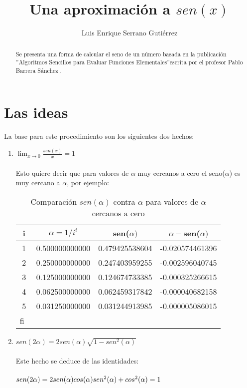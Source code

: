 \documentclass[letter,12pt]{article}
\title{Una aproximación a $sen(x)$}
\author{Luis Enrique Serrano Gutiérrez}
\begin{document}
\maketitle


\begin{abstract}
Se presenta una forma de calcular el seno de un número basada en la publicación ''Algoritmos Sencillos para Evaluar Funciones Elementales''escrita por el profesor Pablo Barrera Sánchez \cite{AlgoritmosPablo}.
\end{abstract}

\section*{Las ideas}
La base para este procedimiento son los siguientes dos hechos: 
\begin{enumerate}
	\item $\lim_{x\to 0} \frac{sen(x)}{x} = 1$\\\\	
Esto quiere decir que para valores de $\alpha$ muy cercanos a cero el seno($\alpha$) es muy cercano a $\alpha$, por ejemplo:
	\begin{table}[h!]
		\centering
		\begin{tabular}{ |c|c|c|c| } 
		  \hline
		 	i & $\alpha = 1/i^i$ & sen($\alpha)$ & $\alpha - $sen($\alpha)$ \\
		  \hline
			1 & 0.500000000000 & 0.479425538604 & -0.020574461396\\
			2 & 0.250000000000 & 0.247403959255 & -0.002596040745\\
			3 & 0.125000000000 & 0.124674733385 & -0.000325266615\\
			4 & 0.062500000000 & 0.062459317842 & -0.000040682158\\
			5 & 0.031250000000 & 0.031244913985 & -0.000005086015\\fi\	  
		 \hline
		\end{tabular}
	\caption{Comparación $sen(\alpha)$ contra $\alpha$ para valores de $\alpha$ cercanos a cero}
	\label{table:1}
	\end{table}	
	\enlargethispage*\baselineskip{}
	\item $sen(2\alpha)=2sen(\alpha)\sqrt{1-sen^2(\alpha)}$\\\\
	Este hecho se deduce de las identidades:\\\\
	$sen(2\alpha)=2sen(\alpha)cos(\alpha)\\
	sen^2(\alpha)+cos^2(\alpha)=1$
\end{enumerate}
\end{document}
